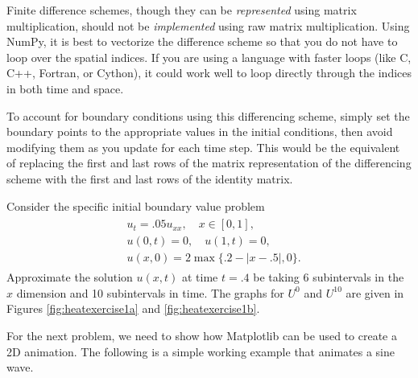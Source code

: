 \begin{info}
Finite difference schemes, though they can be \emph{represented} using matrix multiplication, should not be \emph{implemented} using raw matrix multiplication.
Using NumPy, it is best to vectorize the difference scheme so that you do not have to loop over the spatial indices.
If you are using a language with faster loops (like C, C++, Fortran, or Cython), it could work well to loop directly through the indices in both time and space.
\end{info}

To account for boundary conditions using this differencing scheme, simply set the boundary points to the appropriate values in the initial conditions, then avoid modifying them as you update for each time step.
This would be the equivalent of replacing the first and last rows of the matrix representation of the differencing scheme with the first and last rows of the identity matrix.

\begin{problem}
\label{prob:heat_exercise1}
Consider the specific initial boundary value problem
\begin{align}
	\begin{split}
	&{ } u_t = .05 u_{xx}, \quad x \in [0,1], \\
	&{ } u(0,t) = 0,\quad u(1,t) = 0,\\
	&{ } u(x,0) = 2\max\{.2 - |x-.5|,0\}.
	\end{split}
\end{align}
Approximate the solution $u(x,t)$ at time $t = .4$ be taking 6 subintervals in the $x$ dimension and 10 subintervals in time.
The graphs for $U^0$ and $U^{10}$ are given in Figures \ref{fig:heatexercise1a} and \ref{fig:heatexercise1b}.
\end{problem}

For the next problem, we need to show how Matplotlib can be used to create a 2D animation.
The following is a simple working example that animates a sine wave.


